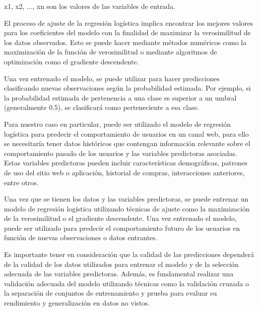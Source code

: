 \begin{itemize}
    x1, x2, ..., xn son los valores de las variables de entrada.

    El proceso de ajuste de la regresión logística implica encontrar los mejores valores para los coeficientes del modelo con la finalidad de maximizar la verosimilitud de los datos observados. Esto se puede hacer mediante métodos numéricos como la maximización de la función de verosimilitud o mediante algoritmos de optimización como el gradiente descendente.

    Una vez entrenado el modelo, se puede utilizar para hacer predicciones clasificando nuevas observaciones según la probabilidad estimada. Por ejemplo, si la probabilidad estimada de pertenencia a una clase es superior a un umbral (generalmente 0.5), se clasificará como perteneciente a esa clase.

    Para nuestro caso en particular, puede ser utilizado el modelo de regresión logística para predecir el comportamiento de usuarios en un canal web, para ello se necesitaría tener datos históricos que contengan información relevante sobre el comportamiento pasado de los usuarios y las variables predictoras asociadas. Estas variables predictoras pueden incluir características demográficas, patrones de uso del sitio web o aplicación, historial de compras, interacciones anteriores, entre otros.

    Una vez que se tienen los datos y las variables predictoras, se puede entrenar un modelo de regresión logística utilizando técnicas de ajuste como la maximización de la verosimilitud o el gradiente descendente. Una vez entrenado el modelo, puede ser utilizado para predecir el comportamiento futuro de los usuarios en función de nuevas observaciones o datos entrantes.

    Es importante tener en consideración que la calidad de las predicciones dependerá de la calidad de los datos utilizados para entrenar el modelo y de la selección adecuada de las variables predictoras. Además, es fundamental realizar una validación adecuada del modelo utilizando técnicas como la validación cruzada o la separación de conjuntos de entrenamiento y prueba para evaluar su rendimiento y generalización en datos no vistos.
    

\end{itemize}
